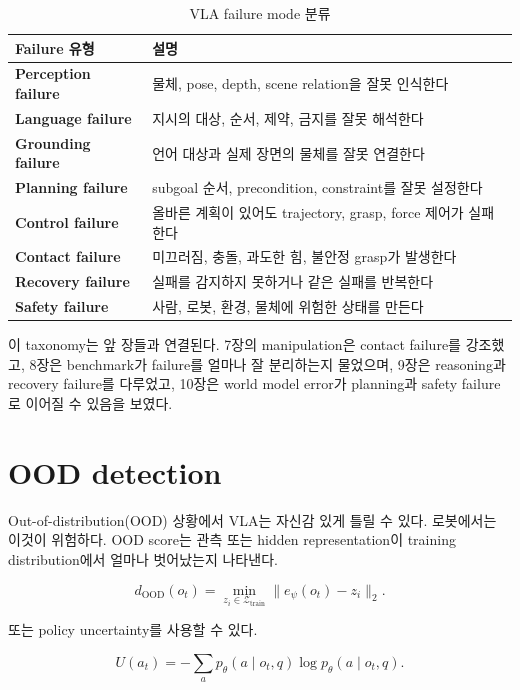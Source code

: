 \begin{table}[t]
  \centering
  \caption{VLA failure mode 분류}
  \label{tab:vla_failure_taxonomy}
  \begin{tabularx}{\textwidth}{>{\bfseries}p{32mm}X}
    \toprule
    Failure 유형 & 설명 \\
    \midrule
    Perception failure & 물체, pose, depth, scene relation을 잘못 인식한다 \\
    Language failure & 지시의 대상, 순서, 제약, 금지를 잘못 해석한다 \\
    Grounding failure & 언어 대상과 실제 장면의 물체를 잘못 연결한다 \\
    Planning failure & subgoal 순서, precondition, constraint를 잘못 설정한다 \\
    Control failure & 올바른 계획이 있어도 trajectory, grasp, force 제어가 실패한다 \\
    Contact failure & 미끄러짐, 충돌, 과도한 힘, 불안정 grasp가 발생한다 \\
    Recovery failure & 실패를 감지하지 못하거나 같은 실패를 반복한다 \\
    Safety failure & 사람, 로봇, 환경, 물체에 위험한 상태를 만든다 \\
    \bottomrule
  \end{tabularx}
\end{table}

이 taxonomy는 앞 장들과 연결된다. 7장의 manipulation은 contact failure를 강조했고, 8장은 benchmark가 failure를 얼마나 잘 분리하는지 물었으며, 9장은 reasoning과 recovery failure를 다루었고, 10장은 world model error가 planning과 safety failure로 이어질 수 있음을 보였다.

\section{OOD detection}

Out-of-distribution(OOD) 상황에서 VLA는 자신감 있게 틀릴 수 있다. 로봇에서는 이것이 위험하다. OOD score는 관측 또는 hidden representation이 training distribution에서 얼마나 벗어났는지 나타낸다.

\begin{equation}
  d_{\mathrm{OOD}}(o_t)
  =
  \min_{z_i \in \mathcal{Z}_{\mathrm{train}}}
  \| e_\psi(o_t) - z_i \|_2.
\end{equation}

또는 policy uncertainty를 사용할 수 있다.

\begin{equation}
  U(a_t)
  =
  -\sum_a
  p_\theta(a \mid o_t,q)
  \log
  p_\theta(a \mid o_t,q).
\end{equation}

